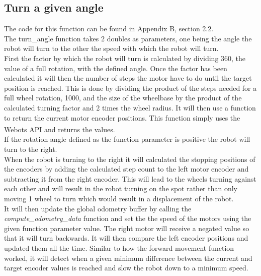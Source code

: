 \subsection{Turn a given angle}
The code for this function can be found in Appendix B, section 2.2.\\
The turn\_angle function takes 2 doubles as parameters, one being the angle the robot will turn to the other the speed with which the robot will turn.\\
First the factor by which the robot will turn is calculated by dividing 360, the value of a full rotation, with the defined angle.
Once the factor has been calculated it will then the number of steps the motor have to do until the target position is reached. This is done by dividing the product of the steps needed for a full wheel rotation, 1000, and the size of the wheelbase by the product of the calculated turning factor and 2 times the wheel radius. It will then use a function to return the current motor encoder positions. This function simply uses the Webots\textsuperscript{\texttrademark}  API and returns the values. \\[3ex]

If the rotation angle defined as the function parameter is positive the robot will turn to the right.\\
When the robot is turning to the right it will calculated the stopping positions of the encoders by adding the calculated step count to the left motor encoder and subtracting it from the right encoder. This will lead to the wheels turning against each other and will result in the robot turning on the spot rather than only moving 1 wheel to turn which would result in a displacement of the robot. \\
It will then update the global odometry buffer by calling the \textit{compute\_odometry\_data} function and set the the speed of the motors using the given function parameter value. The right motor will receive a negated value so that it will turn backwards. 
It will then compare the left encoder positions and updated them all the time. Similar to how the forward movement function worked, it will detect when a given minimum difference between the current and target encoder values is reached and slow the robot down to a minimum speed. \\[3ex]

